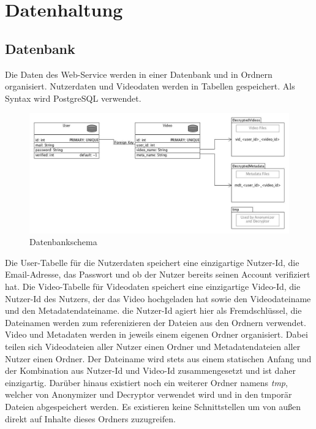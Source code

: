 \section{Datenhaltung}

\subsection{Datenbank}
Die Daten des Web-Service werden in einer Datenbank und in Ordnern organisiert. 
Nutzerdaten und Videodaten werden in Tabellen gespeichert. Als Syntax wird PostgreSQL verwendet. 

\begin{figure}[ht]
	\centering
\includegraphics[width=1\textwidth]{./resources/Diagramme/Webservice/database_scheme.jpg}
\caption{Datenbankschema}
	\label{fig:overview_mvp}
\end{figure}

Die User-Tabelle für die Nutzerdaten speichert eine einzigartige Nutzer-Id, die Email-Adresse, das Passwort und ob der Nutzer bereits seinen Account verifiziert hat.\newline
Die Video-Tabelle für Videodaten speichert eine einzigartige  Video-Id, die Nutzer-Id des Nutzers, der das Video hochgeladen hat sowie den Videodateiname und den Metadatendateiname. die Nutzer-Id agiert hier als Fremdschlüssel, die Dateinamen werden zum referenizieren der Dateien aus den Ordnern verwendet.\newline
Video und Metadaten werden in jeweils einem eigenen Ordner organisiert. Dabei teilen sich Videodateien aller Nutzer einen Ordner und Metadatendateien aller Nutzer einen Ordner. Der Dateiname wird stets aus einem statischen Anfang und der Kombination aus Nutzer-Id und Video-Id zusammengesetzt und ist daher einzigartig.\newline
Darüber hinaus existiert noch ein weiterer Ordner namens \textit{tmp}, welcher von Anonymizer und Decryptor verwendet wird und in den tmporär Dateien abgespeichert werden. Es existieren keine Schnittstellen um von außen direkt auf Inhalte dieses Ordners zuzugreifen.


